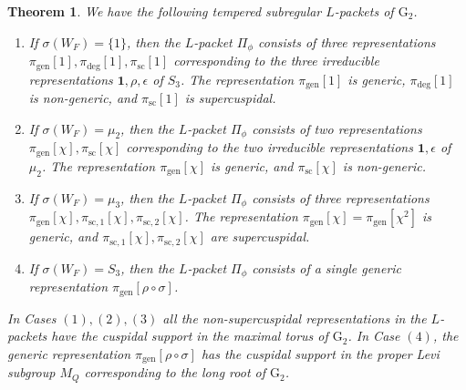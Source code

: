 \documentclass[12pt]{amsart}
\theoremstyle{definition}
\theoremstyle{plain}
\newtheorem{theorem}[definition]{Theorem}
\theoremstyle{remark}
\numberwithin{equation}{section}
\newcommand{\gen}{\mathrm{gen}}
\newcommand{\rG}{\mathrm{G}}
\begin{document}
\begin{theorem}\label{thm:tempered-subregular-elements}
      We have the following tempered subregular $L$-packets of ${\rG_2}$.
      \begin{enumerate}
            \item 
            If $\sigma(W_F) = \{1\}$, then the $L$-packet $\Pi_{\phi}$ consists of three representations $\pi_{\gen}[1], \pi_{\deg}[1], \pi_{\mathrm{sc}}[1]$ corresponding to the three irreducible representations $\mathbf{1}, \rho, \epsilon$ of $S_3$.
            The representation $\pi_{\gen}[1]$ is generic, $\pi_{\deg}[1]$ is non-generic, and $\pi_{\mathrm{sc}}[1]$ is supercuspidal.
            \item 
            If $\sigma(W_F) = \mu_2$, then the $L$-packet $\Pi_{\phi}$ consists of two representations $\pi_{\gen}[\chi], \pi_{\mathrm{sc}}[\chi]$ corresponding to the two irreducible representations $\mathbf{1}, \epsilon$ of $\mu_2$.
            The representation $\pi_{\gen}[\chi]$ is generic, and $\pi_{\mathrm{sc}}[\chi]$ is non-generic.
            \item 
            If $\sigma(W_F) = \mu_3$, then the $L$-packet $\Pi_{\phi}$ consists of three representations $\pi_{\gen}[\chi], \pi_{\mathrm{sc}, 1}[\chi], \pi_{\mathrm{sc}, 2}[\chi]$.
            The representation $\pi_{\gen}[\chi] = \pi_{\gen}[\chi^2]$ is generic, and $\pi_{\mathrm{sc}, 1}[\chi], \pi_{\mathrm{sc}, 2}[\chi]$ are supercuspidal.
            \item 
            If $\sigma(W_F) = S_3$, then the $L$-packet $\Pi_{\phi}$ consists of a single generic representation $\pi_{\gen}[\rho \circ \sigma]$.
      \end{enumerate}

      In Cases $(1), (2), (3)$ all the non-supercuspidal representations in the $L$-packets have the cuspidal support in the maximal torus of ${\rG_2}$.
      In Case $(4)$, the generic representation $\pi_{\gen}[\rho \circ \sigma]$ has the cuspidal support in the proper Levi subgroup $M_Q$ corresponding to the long root of ${\rG_2}$.
\end{theorem}
\end{document}
